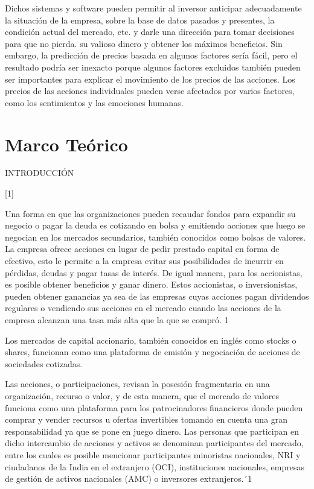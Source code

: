 \documentclass[a4paper]{article}
\begin{document}
Dichos sistemas y software pueden permitir al inversor anticipar adecuadamente la situación de la empresa, sobre la base de datos pasados y presentes, la condición actual del mercado, etc. y darle una dirección para tomar decisiones para que no pierda. su valioso dinero y obtener los máximos beneficios. Sin embargo, la predicción de precios basada en algunos factores sería fácil, pero el resultado podría ser inexacto porque algunos factores excluidos también pueden ser importantes para explicar el movimiento de los precios de las acciones. Los precios de las acciones individuales pueden verse afectados por varios factores, como los sentimientos y las emociones humanas. 

\section{Marco Te\'orico}
INTRODUCCIÓN 

[1] 

Una forma en que las organizaciones pueden recaudar fondos para expandir su negocio o pagar la deuda es cotizando en bolsa y emitiendo acciones que luego se negocian en los mercados secundarios, también conocidos como bolsas de valores. La empresa ofrece acciones en lugar de pedir prestado capital en forma de efectivo, esto le permite a la empresa evitar sus posibilidades de incurrir en pérdidas, deudas y pagar tasas de interés. De igual manera, para los accionistas, es posible obtener beneficios y ganar dinero. Estos accionistas, o inversionistas, pueden obtener ganancias ya sea de las empresas cuyas acciones pagan dividendos regulares o vendiendo sus acciones en el mercado cuando las acciones de la empresa alcanzan una tasa más alta que la que se compró. {1} 

Los mercados de capital accionario, también conocidos en inglés como stocks o shares, funcionan como una plataforma de emisión y negociación de acciones de sociedades cotizadas. 

Las acciones, o participaciones, revisan la posesión fragmentaria en una organización, recurso o valor, y de esta manera, que el mercado de valores funciona como una plataforma para los patrocinadores financieros donde pueden comprar y vender recursos u ofertas invertibles tomando en cuenta una gran responsabilidad ya que se pone en juego dinero. Las personas que participan en dicho intercambio de acciones y activos se denominan participantes del mercado, entre los cuales es posible mencionar participantes minoristas nacionales, NRI y ciudadanos de la India en el extranjero (OCI), instituciones nacionales, empresas de gestión de activos nacionales (AMC) o inversores extranjeros.´{1} 
\end{document}
